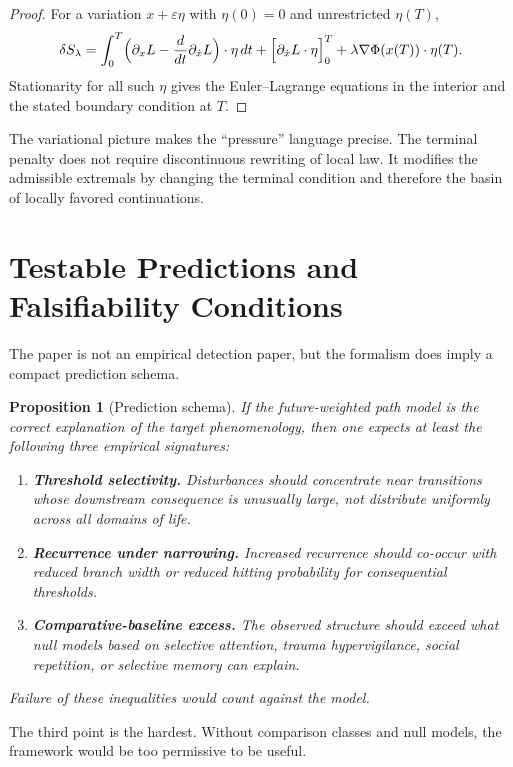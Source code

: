 \documentclass[12pt]{article}
\newtheorem{proposition}{Proposition}
\begin{document}
\begin{proof}
For a variation $x+\varepsilon \eta$ with $\eta(0)=0$ and unrestricted $\eta(T)$,
\[
\delta S_\lambda = \int_0^T \Bigl(\partial_xL - \frac{d}{dt}\partial_{\dot x}L\Bigr)\cdot \eta\,dt + \Bigl[\partial_{\dot x}L\cdot \eta\Bigr]_0^T + \lambda \nabla\Phi(x(T))\cdot \eta(T).
\]
Stationarity for all such $\eta$ gives the Euler--Lagrange equations in the interior and the stated boundary condition at $T$.
\end{proof}

The variational picture makes the ``pressure'' language precise. The terminal penalty does not require discontinuous rewriting of local law. It modifies the admissible extremals by changing the terminal condition and therefore the basin of locally favored continuations.

\section{Testable Predictions and Falsifiability Conditions}

The paper is not an empirical detection paper, but the formalism does imply a compact prediction schema.

\begin{proposition}[Prediction schema]
If the future-weighted path model is the correct explanation of the target phenomenology, then one expects at least the following three empirical signatures:
\begin{enumerate}[label=\arabic*.]
    \item \textbf{Threshold selectivity.} Disturbances should concentrate near transitions whose downstream consequence is unusually large, not distribute uniformly across all domains of life.
    \item \textbf{Recurrence under narrowing.} Increased recurrence should co-occur with reduced branch width or reduced hitting probability for consequential thresholds.
    \item \textbf{Comparative-baseline excess.} The observed structure should exceed what null models based on selective attention, trauma hypervigilance, social repetition, or selective memory can explain.
\end{enumerate}
Failure of these inequalities would count against the model.
\end{proposition}

The third point is the hardest. Without comparison classes and null models, the framework would be too permissive to be useful.
\end{document}
